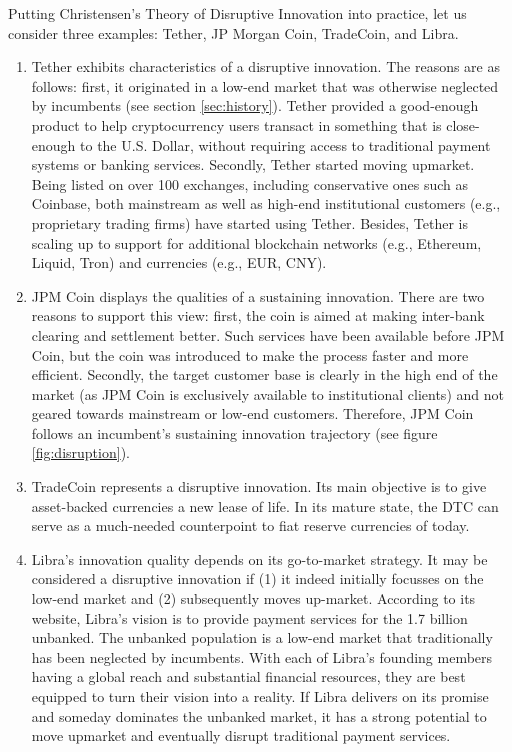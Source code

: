 \documentclass[conference]{IEEEtran}
\begin{document}
Putting Christensen's Theory of Disruptive Innovation into practice, let us consider three examples: Tether, JP Morgan Coin, TradeCoin, and Libra.

\begin{enumerate}
	\item Tether exhibits characteristics of a disruptive innovation. The reasons are as follows: first, it originated in a low-end market that was otherwise neglected by incumbents (see section \ref{sec:history}). Tether provided a good-enough product to help cryptocurrency users transact in something that is close-enough to the U.S. Dollar, without requiring access to traditional payment systems or banking services. Secondly, Tether started moving upmarket. Being listed on over 100 exchanges, including conservative ones such as Coinbase, both mainstream as well as high-end institutional customers (e.g., proprietary trading firms) have started using Tether. Besides, Tether is scaling up to support for additional blockchain networks (e.g., Ethereum, Liquid, Tron) and currencies (e.g., EUR, CNY).
	\item JPM Coin displays the qualities of a sustaining innovation. There are two reasons to support this view: first, the coin is aimed at making inter-bank clearing and settlement better. Such services have been available before JPM Coin, but the coin was introduced to make the process faster and more efficient. Secondly, the target customer base is clearly in the high end of the market (as JPM Coin is exclusively available to institutional clients) and not geared towards mainstream or low-end customers. Therefore, JPM Coin follows an incumbent's sustaining innovation trajectory (see figure \ref{fig:disruption}).
	\item TradeCoin represents a disruptive innovation. Its main objective is to give asset-backed currencies a new lease of life. In its mature state, the DTC can serve as a much-needed counterpoint to fiat reserve currencies of today.
	\item Libra's innovation quality depends on its go-to-market strategy. It may be considered a disruptive innovation if (1) it indeed initially focusses on the low-end market and (2) subsequently moves up-market. According to its website, Libra's vision is to provide payment services for the 1.7 billion unbanked. The unbanked population is a low-end market that traditionally has been neglected by incumbents. With each of Libra's founding members having a global reach and substantial financial resources, they are best equipped to turn their vision into a reality. If Libra delivers on its promise and someday dominates the unbanked market, it has a strong potential to move upmarket and eventually disrupt traditional payment services.
\end{enumerate}
\end{document}
